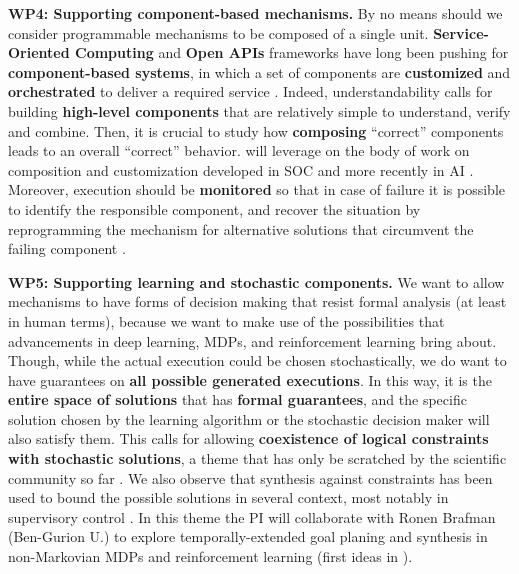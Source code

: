 \textbf{WP4: Supporting component-based mechanisms.}
  By no means should we consider programmable mechanisms to be
  composed of a single unit. \textbf{Service-Oriented Computing} and
  \textbf{Open APIs} frameworks have long been pushing for
  \textbf{component-based systems}, in which a set of components are
  \textbf{customized} and \textbf{orchestrated} to deliver a required
  service \cite{wsf2014}.  Indeed, understandability calls for
  building \textbf{high-level components} that are relatively simple
  to understand, verify and combine. Then, it is crucial to study how
  \textbf{composing} ``correct'' components leads to an overall
  ``correct'' behavior.
\project will leverage on the body of work on composition and customization developed in SOC and more recently in AI
 \cite{SohrabiPM09,BertoliPT10,DePS13,DeGGPSS16}.%
Moreover, execution should be \textbf{monitored} so that in case of
failure it is possible to identify the responsible component, and
recover the situation by reprogramming the mechanism for alternative
solutions that circumvent the failing
component \cite{DeGMGMM14,MarrellaMS17}.



\textbf{WP5: Supporting learning and stochastic components.}
We want to allow mechanisms to have forms of decision making that
resist formal analysis (at least in human terms), because we want to
make use of the possibilities that advancements in deep learning,
MDPs, and reinforcement learning bring about. Though, while the actual
execution could be chosen stochastically, we do want to have
guarantees on \textbf{all possible generated executions}.  In this
way, it is the \textbf{entire space of solutions} that has
\textbf{formal guarantees}, and the specific solution chosen by the
learning algorithm or the stochastic decision maker will also satisfy
them. %
  This calls for allowing \textbf{coexistence of logical constraints
    with stochastic solutions}, a theme that has only be scratched by
  the scientific community so far \cite{BeckL12,SprauelKT14,BDMS17}.
   We also observe that synthesis against constraints has been used to bound the
  possible solutions in several context, most notably in supervisory
  control \cite{Wo14,BanihashemiGL16}.
In this theme the PI will collaborate  with
Ronen Brafman (Ben-Gurion U.) to explore
temporally-extended goal planing and synthesis in non-Markovian MDPs
and reinforcement learning (first ideas in \cite{BDMS17}).



